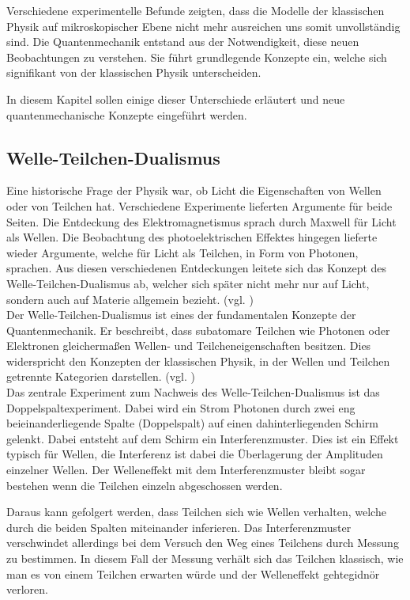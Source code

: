 Verschiedene experimentelle Befunde zeigten, dass die Modelle der klassischen Physik auf mikroskopischer Ebene nicht mehr ausreichen uns somit unvollständig sind. Die Quantenmechanik entstand aus der Notwendigkeit, diese neuen Beobachtungen zu verstehen. Sie führt grundlegende Konzepte ein, welche sich signifikant von der klassischen Physik unterscheiden.


In diesem Kapitel sollen einige dieser Unterschiede erläutert und neue quantenmechanische Konzepte eingeführt werden.

\subsection{Welle-Teilchen-Dualismus}
\label{Welle-Teilchen-Dualismus}

Eine historische Frage der Physik war, ob Licht die Eigenschaften von Wellen oder von Teilchen hat. Verschiedene Experimente lieferten Argumente für beide Seiten. Die Entdeckung des Elektromagnetismus sprach durch Maxwell für Licht als Wellen. Die Beobachtung des photoelektrischen Effektes hingegen lieferte wieder Argumente, welche für Licht als Teilchen, in Form von Photonen, sprachen. Aus diesen verschiedenen Entdeckungen leitete sich das Konzept des Welle-Teilchen-Dualismus ab, welcher sich später nicht mehr nur auf Licht, sondern auch auf Materie allgemein bezieht. (vgl. \cite[Ch. 1.3.2]{kasirajan_fundamentals_2021})\\

Der Welle-Teilchen-Dualismus ist eines der fundamentalen Konzepte der Quantenmechanik. Er beschreibt, dass subatomare Teilchen wie Photonen oder Elektronen gleichermaßen Wellen- und Teilcheneigenschaften besitzen. Dies widerspricht den Konzepten der klassischen Physik, in der Wellen und Teilchen getrennte Kategorien darstellen. (vgl. \cite[Ch. 2]{schmitz_particles_2022})\\

Das zentrale Experiment zum Nachweis des Welle-Teilchen-Dualismus ist das Doppelspaltexperiment. Dabei wird ein Strom Photonen durch zwei eng beieinanderliegende Spalte (Doppelspalt) auf einen dahinterliegenden Schirm gelenkt. Dabei entsteht auf dem Schirm ein Interferenzmuster. Dies ist ein Effekt typisch für  Wellen, die Interferenz ist dabei die Überlagerung der Amplituden einzelner Wellen. Der Welleneffekt mit dem Interferenzmuster bleibt sogar bestehen wenn die Teilchen einzeln abgeschossen werden.


Daraus kann gefolgert werden, dass Teilchen sich wie Wellen verhalten, welche durch die beiden Spalten miteinander inferieren. Das Interferenzmuster verschwindet allerdings bei dem Versuch den Weg eines Teilchens durch Messung zu bestimmen. In diesem Fall der Messung verhält sich das Teilchen klassisch, wie man es von einem Teilchen erwarten würde und der Welleneffekt gehtegidnör verloren.


